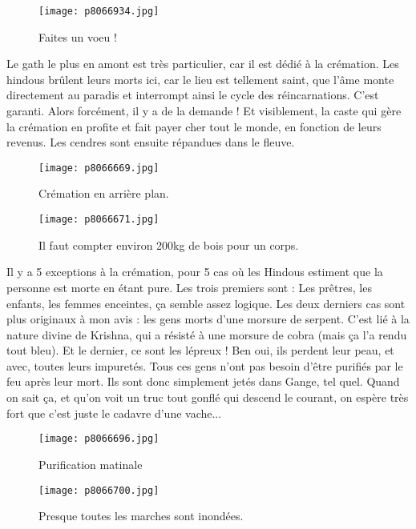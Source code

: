 \documentclass{book}
\begin{document}
\begin{figure}[h]
\centering
\texttt{[image: p8066934.jpg]}
\caption*{Faites un voeu !}
\end{figure}

Le gath le plus en amont est très particulier, car il est dédié à la crémation. Les hindous brûlent leurs morts ici, car le lieu est tellement saint, que l'âme monte directement au paradis et interrompt ainsi le cycle des réincarnations. C'est garanti. Alors forcément, il y a de la demande ! Et visiblement, la caste qui gère la crémation en profite et fait payer cher tout le monde, en fonction de leurs revenus. Les cendres sont ensuite répandues dans le fleuve.


\begin{figure}[h]
\centering
\texttt{[image: p8066669.jpg]}
\caption*{Crémation en arrière plan.}
\end{figure}


\begin{figure}[h]
\centering
\texttt{[image: p8066671.jpg]}
\caption*{Il faut compter environ 200kg de bois pour un corps.}
\end{figure}

Il y a 5 exceptions à la crémation, pour 5 cas où les Hindous estiment que la personne est morte en étant pure. Les trois premiers sont : Les prêtres, les enfants, les femmes enceintes, ça semble assez logique. Les deux derniers cas sont plus originaux à mon avis : les gens morts d'une morsure de serpent. C'est lié à la nature divine de Krishna, qui a résisté à une morsure de cobra (mais ça l'a rendu tout bleu). Et le dernier, ce sont les lépreux ! Ben oui, ils perdent leur peau, et avec, toutes leurs impuretés. Tous ces gens n'ont pas besoin d'être purifiés par le feu après leur mort. Ils sont donc simplement jetés dans Gange, tel quel. Quand on sait ça, et qu'on voit un truc tout gonflé qui descend le courant, on espère très fort que c'est juste le cadavre d'une vache...


\begin{figure}[h]
\centering
\texttt{[image: p8066696.jpg]}
\caption*{Purification matinale}
\end{figure}


\begin{figure}[h]
\centering
\texttt{[image: p8066700.jpg]}
\caption*{Presque toutes les marches sont inondées.}
\end{figure}
\end{document}
